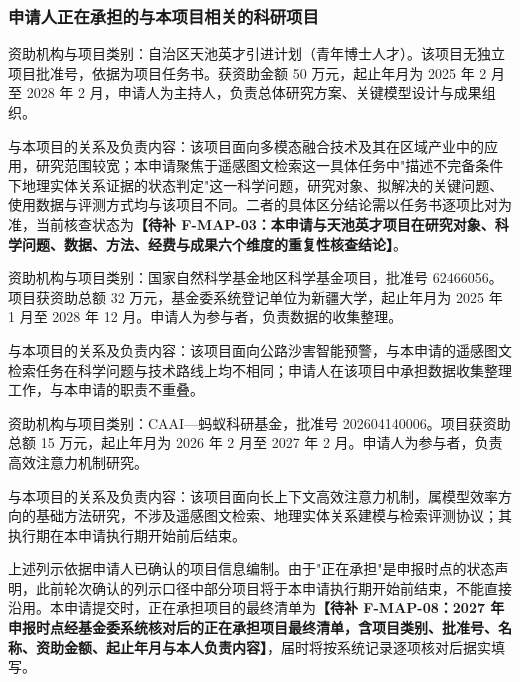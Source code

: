 \justifying
\NSFCBodyText

\subsubsection{申请人正在承担的与本项目相关的科研项目}


资助机构与项目类别：自治区天池英才引进计划（青年博士人才）。该项目无独立项目批准号，依据为项目任务书。获资助金额 50 万元，起止年月为 2025 年 2 月至 2028 年 2 月，申请人为主持人，负责总体研究方案、关键模型设计与成果组织。

与本项目的关系及负责内容：该项目面向多模态融合技术及其在区域产业中的应用，研究范围较宽；本申请聚焦于遥感图文检索这一具体任务中"描述不完备条件下地理实体关系证据的状态判定"这一科学问题，研究对象、拟解决的关键问题、使用数据与评测方式均与该项目不同。二者的具体区分结论需以任务书逐项比对为准，当前核查状态为\textbf{【待补 F-MAP-03：本申请与天池英才项目在研究对象、科学问题、数据、方法、经费与成果六个维度的重复性核查结论】}。


资助机构与项目类别：国家自然科学基金地区科学基金项目，批准号 62466056。项目获资助总额 32 万元，基金委系统登记单位为新疆大学，起止年月为 2025 年 1 月至 2028 年 12 月。申请人为参与者，负责数据的收集整理。

与本项目的关系及负责内容：该项目面向公路沙害智能预警，与本申请的遥感图文检索任务在科学问题与技术路线上均不相同；申请人在该项目中承担数据收集整理工作，与本申请的职责不重叠。


资助机构与项目类别：CAAI---蚂蚁科研基金，批准号 202604140006。项目获资助总额 15 万元，起止年月为 2026 年 2 月至 2027 年 2 月。申请人为参与者，负责高效注意力机制研究。

与本项目的关系及负责内容：该项目面向长上下文高效注意力机制，属模型效率方向的基础方法研究，不涉及遥感图文检索、地理实体关系建模与检索评测协议；其执行期在本申请执行期开始前后结束。


上述列示依据申请人已确认的项目信息编制。由于"正在承担"是申报时点的状态声明，此前轮次确认的列示口径中部分项目将于本申请执行期开始前结束，不能直接沿用。本申请提交时，正在承担项目的最终清单为\textbf{【待补 F-MAP-08：2027 年申报时点经基金委系统核对后的正在承担项目最终清单，含项目类别、批准号、名称、资助金额、起止年月与本人负责内容】}，届时将按系统记录逐项核对后据实填写。

